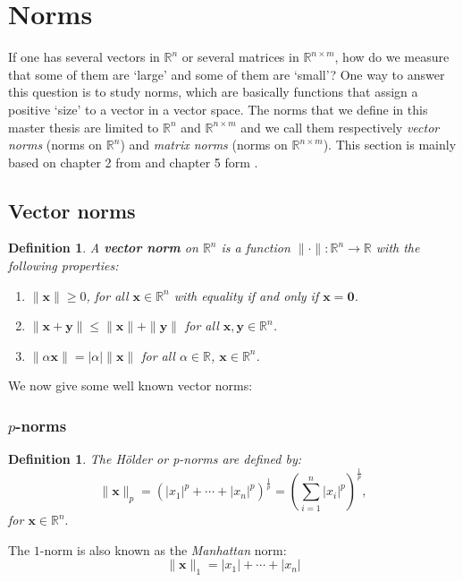 \documentclass[a4paper,11pt]{report}
\newtheorem{definition}[theorem]{Definition}
\newcommand{\R}{{\mathbb R}}
\begin{document}
\section{Norms}
If one has several vectors in $\R^n$ or several matrices in $\R^{n\times m}$, 
how do we measure that some of them are `large' and some of them are `small'? 
One way to answer this question is to study norms, which are basically functions 
that assign a positive `size' to a vector in a vector space. The norms that we define 
in this master thesis are limited to $\R^n$ and $\R^{n\times m}$ and we call 
them respectively \emph{vector norms} (norms on $\R^n$) and \emph{matrix norms} (norms on $\R^{n\times 
m}$). This section is mainly based on chapter 2 from \cite{golub} and chapter 5 
form \cite{horn}.

\subsection{Vector norms}
\begin{definition}\label{vectornorms}
  A \textbf{vector norm} on $\R^n$ is a function $\|\cdot\|: \R^n \to \R$ with 
  the following properties:
  \begin{enumerate}
 \item $\|\mathbf{x}\| \geq 0$, for all $\mathbf{x} \in \R^n$ with equality if 
 and only if $\mathbf{x} = \mathbf{0}$.
 \item $\|\mathbf{x} + \mathbf{y}\| \leq \|\mathbf{x}\| + \|\mathbf{y}\|$ for 
 all $\mathbf{x},\mathbf{y} \in \R^n$.
 \item $\|\alpha \mathbf{x}\| = |\alpha|\|\mathbf{x}\|$ for all $\alpha \in \R$, $\mathbf{x} \in 
 \R^n$.
  \end{enumerate}
\end{definition}



We now give some well known vector norms:
\subsubsection{$p$-norms}
\begin{definition}\label{holderdebolder}
  The \textit{H\"{o}lder} or  \emph{p-norms} are defined by:
  $$\|\mathbf{x}\|_p = (|x_1|^p+\cdots + |x_n|^p)^{\frac{1}{p}} = \left(\sum_{i=1}^n |x_i|^p\right)^{\frac{1}{p}},$$
  for $\mathbf{x} \in \R^n.$
\end{definition}
The $1$-norm is also known as the \emph{Manhattan} norm:
$$\|\mathbf{x}\|_1 = |x_1|+  \cdots + |x_n|$$
\end{document}
